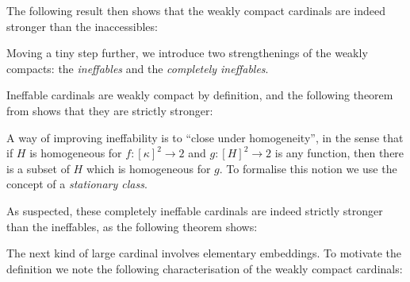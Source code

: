 \documentclass[../../main]{subfiles}
\begin{document}
\qquad The following result then shows that the weakly compact cardinals are indeed stronger than the inaccessibles:


Moving a tiny step further, we introduce two strengthenings of the weakly compacts: the \textit{ineffables} and the \textit{completely ineffables}.


Ineffable cardinals are weakly compact by definition, and the following theorem from \cite{Friedman} shows that they are strictly stronger:


A way of improving ineffability is to ``close under homogeneity'', in the sense that if $H$ is homogeneous for $f\colon[\kappa]^2\to 2$ and $g\colon[H]^2\to 2$ is any function, then there is a subset of $H$ which is homogeneous for $g$. To formalise this notion we use the concept of a \textit{stationary class}.



As suspected, these completely ineffable cardinals are indeed strictly stronger than the ineffables, as the following theorem shows:


The next kind of large cardinal involves elementary embeddings. To motivate the definition we note the following characterisation of the weakly compact cardinals:
\end{document}
